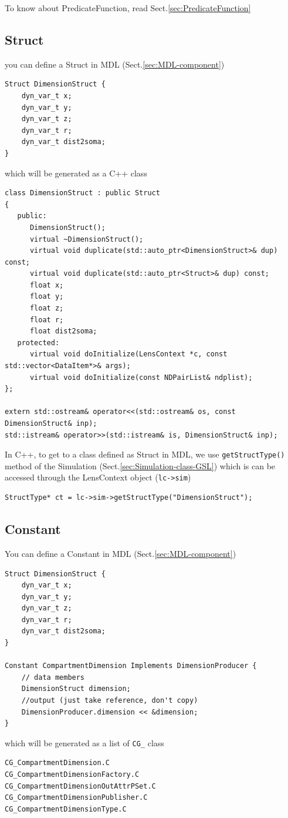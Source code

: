 To know about PredicateFunction, read Sect.\ref{sec:PredicateFunction}

\subsection{Struct}
\label{sec:Struct-MDL}

you can define a Struct in MDL (Sect.\ref{sec:MDL-component})
\begin{verbatim}
Struct DimensionStruct {
	dyn_var_t x;
	dyn_var_t y;
	dyn_var_t z;
	dyn_var_t r;
	dyn_var_t dist2soma;
}
\end{verbatim}

which will be generated as a C++ class
\begin{verbatim}
class DimensionStruct : public Struct
{
   public:
      DimensionStruct();
      virtual ~DimensionStruct();
      virtual void duplicate(std::auto_ptr<DimensionStruct>& dup) const;
      virtual void duplicate(std::auto_ptr<Struct>& dup) const;
      float x;
      float y;
      float z;
      float r;
      float dist2soma;
   protected:
      virtual void doInitialize(LensContext *c, const std::vector<DataItem*>& args);
      virtual void doInitialize(const NDPairList& ndplist);
};

extern std::ostream& operator<<(std::ostream& os, const DimensionStruct& inp);
std::istream& operator>>(std::istream& is, DimensionStruct& inp);
\end{verbatim}

In C++, to get to a class defined as Struct in MDL, we use
\verb!getStructType()! method of the Simulation
(Sect.\ref{sec:Simulation-class-GSL}) which is can be accessed through the
LensContext object (\verb!lc->sim!)
\begin{lstlisting}
StructType* ct = lc->sim->getStructType("DimensionStruct");
\end{lstlisting}

\subsection{Constant}
\label{sec:Constant-MDL}

You can define a Constant in MDL (Sect.\ref{sec:MDL-component})
\begin{verbatim}
Struct DimensionStruct {
	dyn_var_t x;
	dyn_var_t y;
	dyn_var_t z;
	dyn_var_t r;
	dyn_var_t dist2soma;
}

Constant CompartmentDimension Implements DimensionProducer {
	// data members
	DimensionStruct dimension;
	//output (just take reference, don't copy)
	DimensionProducer.dimension << &dimension;
}
\end{verbatim}
which will be generated as a list of \verb!CG_! class
\begin{verbatim}
CG_CompartmentDimension.C             
CG_CompartmentDimensionFactory.C     
CG_CompartmentDimensionOutAttrPSet.C  
CG_CompartmentDimensionPublisher.C    
CG_CompartmentDimensionType.C
\end{verbatim}

